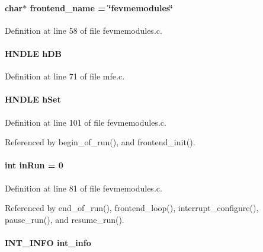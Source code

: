 \paragraph[{frontend\_\-name}]{\setlength{\rightskip}{0pt plus 5cm}char$\ast$ {\bf frontend\_\-name} = \char`\"{}fevmemodules\char`\"{}}\hfill\label{fevmemodules_8c_ac1f0c6df66e35778b61c611107501ec4}


Definition at line 58 of file fevmemodules.c.
\paragraph[{hDB}]{\setlength{\rightskip}{0pt plus 5cm}HNDLE {\bf hDB}}\hfill\label{fevmemodules_8c_ab1f60c53f74e806a3b9f687af38d7421}


Definition at line 71 of file mfe.c.
\paragraph[{hSet}]{\setlength{\rightskip}{0pt plus 5cm}HNDLE {\bf hSet}}\hfill\label{fevmemodules_8c_a24a9e510d792776924958328f8220d75}


Definition at line 101 of file fevmemodules.c.

Referenced by begin\_\-of\_\-run(), and frontend\_\-init().
\paragraph[{inRun}]{\setlength{\rightskip}{0pt plus 5cm}int {\bf inRun} = 0}\hfill\label{fevmemodules_8c_a0f9c151f98b81e4a46f88f47a37cffb1}


Definition at line 81 of file fevmemodules.c.

Referenced by end\_\-of\_\-run(), frontend\_\-loop(), interrupt\_\-configure(), pause\_\-run(), and resume\_\-run().
\paragraph[{int\_\-info}]{\setlength{\rightskip}{0pt plus 5cm}INT\_\-INFO {\bf int\_\-info}}\hfill\label{fevmemodules_8c_ab41e1a698055c9419f431cb4a4c2339c}


